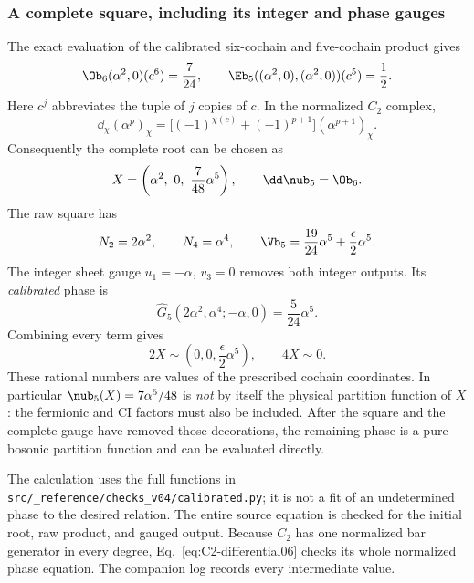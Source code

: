 \subsubsection{A complete square, including its integer and phase gauges}
The exact evaluation of the calibrated six-cochain and five-cochain product gives
\begin{equation}\label{eq:C2-square-numbers06}
 \Ob_6(\alpha^2,0)(c^6)=\frac7{24},\qquad
 \Eb_5((\alpha^2,0),(\alpha^2,0))(c^5)=\frac12.
\end{equation}
Here $c^j$ abbreviates the tuple of $j$ copies of $c$. In the normalized $C_2$ complex,
\begin{equation}\label{eq:C2-differential06}
 \dd_\chi(\alpha^p)_\chi
     =\big[(-1)^{\chi(c)}+(-1)^{p+1}\big](\alpha^{p+1})_\chi.
\end{equation}
Consequently the complete root can be chosen as
\begin{equation}
 X=\left(\alpha^2,\ 0,\ \frac7{48}\alpha^5\right),
 \qquad \dd\nub_5=\Ob_6.
\end{equation}
The raw square has
\begin{equation}
      N_2=2\alpha^2,\qquad N_4=\alpha^4,
      \qquad\Vb_5=\frac{19}{24}\alpha^5
                         +\frac\epsilon2\alpha^5.
\end{equation}
The integer sheet gauge $u_1=-\alpha$, $v_3=0$ removes both integer outputs. Its \emph{calibrated} phase is
\begin{equation}
 \widehat G_5(2\alpha^2,\alpha^4;-\alpha,0)=\frac5{24}\alpha^5.
\end{equation}
Combining every term gives
\begin{equation}\label{eq:square-complete06}
 \boxed{\quad 2X\sim\left(0,0,\frac\epsilon2\alpha^5\right),\qquad
             4X\sim0.\quad}
\end{equation}
These rational numbers are values of the prescribed cochain coordinates. In particular $\nub_5(X)=7\alpha^5/48$ is \emph{not} by itself the physical partition function of $X$: the fermionic and CI factors must also be included. After the square and the complete gauge have removed those decorations, the remaining phase is a pure bosonic partition function and can be evaluated directly.

The calculation uses the full functions in \texttt{src/\_reference/checks\_v04/calibrated.py}; it is not a fit of an undetermined phase to the desired relation. The entire source equation is checked for the initial root, raw product, and gauged output. Because $C_2$ has one normalized bar generator in every degree, Eq.~\eqref{eq:C2-differential06} checks its whole normalized phase equation. The companion log records every intermediate value.

